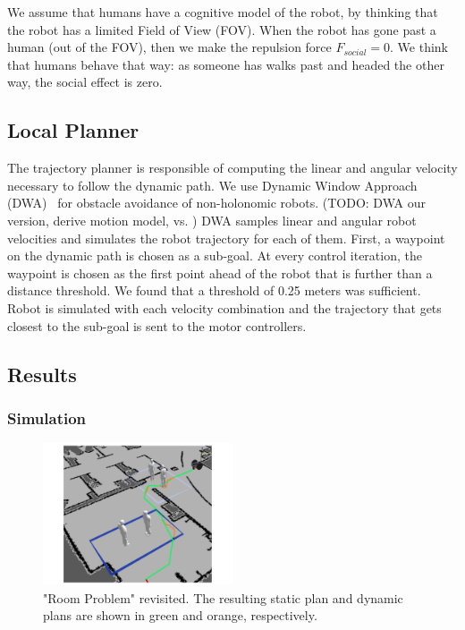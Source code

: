 \documentclass[12pt]{gatech-thesis}
\begin{document}
We assume that humans have a cognitive model of the robot, by thinking that the robot has a limited Field of View (FOV). When the robot has gone past a human (out of the FOV), then we make the repulsion force $F_{social}=0$. We think that humans behave that way: as someone has walks past and headed the other way, the social effect is zero.

\subsection{Local Planner}

The trajectory planner is responsible of computing the linear and angular velocity necessary to follow the dynamic path. We use Dynamic Window Approach (DWA)~\cite{fox1997dynamic} for obstacle avoidance of non-holonomic robots. (TODO: DWA our version, derive motion model, vs. ) DWA samples linear and angular robot velocities and simulates the robot trajectory for each of them. First, a waypoint on the dynamic path is chosen as a sub-goal. At every control iteration, the waypoint is chosen as the first point ahead of the robot that is further than a distance threshold. We found that a threshold of 0.25 meters was sufficient. Robot is simulated with each velocity combination and the trajectory that gets closest to the sub-goal is sent to the motor controllers.

\subsection{Results}

\subsubsection{Simulation}


\begin{figure}[h]
\centering
\includegraphics[width=0.5\textwidth]{pics/room_sol_crop}
\caption{"Room Problem" revisited. The resulting static plan and dynamic plans are shown in green and orange, respectively.}
\label{fig:room_sol}
\end{figure}
\end{document}
